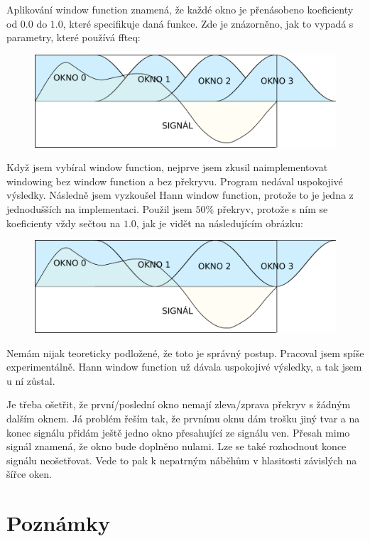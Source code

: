 \documentclass{article}
\begin{document}
Aplikování window function znamená, že každé okno je přenásobeno koeficienty od
$0.0$ do $1.0$, které specifikuje daná funkce. Zde je znázorněno, jak to vypadá
s parametry, které používá ffteq:

\begin{figure}[H]
	\begin{center}
		\includegraphics[width=0.6\linewidth]{windowing-1.png}
	\end{center}
\end{figure}

Když jsem vybíral window function, nejprve jsem zkusil naimplementovat
windowing bez window function a bez překryvu. Program nedával uspokojivé
výsledky. Následně jsem vyzkoušel Hann window function, protože to je jedna z
jednodušších na implementaci. Použil jsem $50\%$ překryv, protože s ním se
koeficienty vždy sečtou na $1.0$, jak je vidět na následujícím obrázku:

\begin{figure}[H]
	\begin{center}
		\includegraphics[width=0.6\linewidth]{windowing-2.png}
	\end{center}
\end{figure}

Nemám nijak teoreticky podložené, že toto je správný postup. Pracoval jsem
spíše experimentálně.  Hann window function už dávala uspokojivé výsledky, a
tak jsem u ní zůstal.

Je třeba ošetřit, že první/poslední okno nemají zleva/zprava překryv s žádným
dalším oknem. Já problém řeším tak, že prvnímu oknu dám trošku jiný tvar a na
konec signálu přidám ještě jedno okno přesahující ze signálu ven. Přesah mimo
signál znamená, že okno bude doplněno nulami. Lze se také rozhodnout konce
signálu neošetřovat. Vede to pak k nepatrným náběhům v hlasitosti závislých na
šířce oken.


\section*{Poznámky}
\end{document}
